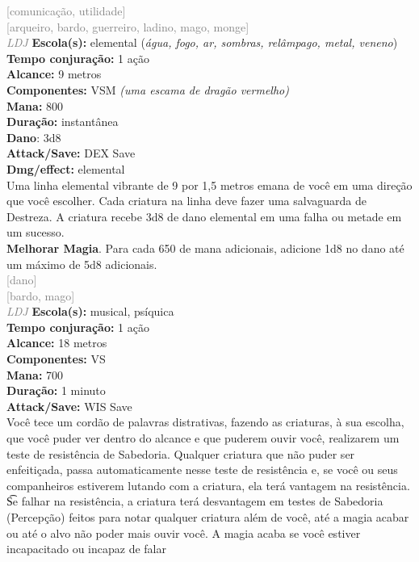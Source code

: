 \documentclass{RPG_Adventure}[2021/10/20]
\begin{document}
{\scriptsize \textcolor{gray}{[comunicação, utilidade]\\}}
{\scriptsize \textcolor{gray}{[arqueiro, bardo, guerreiro, ladino, mago, monge]\\}}
{\tiny \textcolor{gray}{\textit{LDJ}}}
{\small \t \textbf{Escola(s):} elemental (\textit{água, fogo, ar, sombras, relâmpago, metal, veneno})\\\t \textbf{Tempo conjuração:} 1 ação\\\t \textbf{Alcance:} 9 metros\\\t \textbf{Componentes:} VSM \textit{(uma escama de dragão vermelho)}\\\t \textbf{Mana:} 800\\\t \textbf{Duração:} instantânea\\\t \textbf{Dano}: 3d8\\\t \textbf{Attack/Save:} DEX Save\\\t \textbf{Dmg/effect:} elemental\\}
{\normalsize Uma linha elemental vibrante de 9 por 1,5 metros emana de você em uma direção que você escolher. Cada criatura na linha deve fazer uma salvaguarda de Destreza. A criatura recebe 3d8 de dano elemental em uma falha ou metade em um sucesso.\\\t \textbf{Melhorar Magia}. Para cada 650 de mana adicionais, adicione 1d8 no dano até um máximo de 5d8 adicionais.\\}
{\scriptsize \textcolor{gray}{[dano]\\}}
{\scriptsize \textcolor{gray}{[bardo, mago]\\}}
{\tiny \textcolor{gray}{\textit{LDJ}}}
{\small \t \textbf{Escola(s):} musical, psíquica\\\t \textbf{Tempo conjuração:} 1 ação\\\t \textbf{Alcance:} 18 metros\\\t \textbf{Componentes:} VS\\\t \textbf{Mana:} 700\\\t \textbf{Duração:} 1 minuto\\\t \textbf{Attack/Save:} WIS Save\\}
{\normalsize Você tece um cordão de palavras distrativas, fazendo as criaturas, à sua escolha, que você puder ver dentro do alcance e que puderem ouvir você, realizarem um teste de resistência de Sabedoria. Qualquer criatura que não puder ser enfeitiçada, passa automaticamente nesse teste de resistência e, se você ou seus companheiros estiverem lutando com a criatura, ela terá vantagem na resistência.\\\t Se falhar na resistência, a criatura terá desvantagem em testes de Sabedoria (Percepção) feitos para notar qualquer criatura além de você, até a magia acabar ou até o alvo não poder mais ouvir você. A magia acaba se você estiver incapacitado ou incapaz de falar\\}
\end{document}
